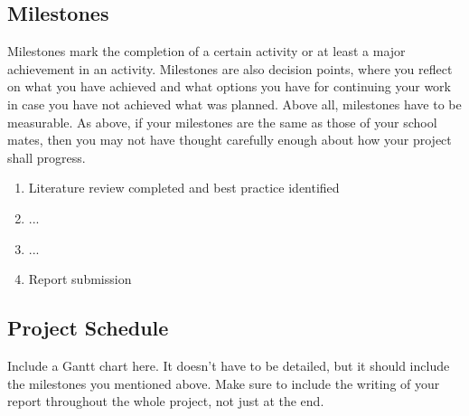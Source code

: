 \documentclass[rnd]{mas_proposal}
\begin{document}
\subsection{Milestones}
Milestones mark the completion of a certain activity or at least a major achievement in an activity. Milestones are also decision points, where you reflect on what you have achieved and what options you have for continuing your work in case you have not achieved what was planned. Above all, milestones have to be measurable. As above, if your milestones are the same as those of your school mates, then you may not have thought carefully enough about how your project shall progress.
\begin{enumerate}
    \item[M1] Literature review completed and best practice identified
    \item[M2] ...
    \item[M3] ...
    \item[M4] Report submission
\end{enumerate}

\subsection{Project Schedule}
Include a Gantt chart here. It doesn't have to be detailed, but it should include the milestones you mentioned above.
Make sure to include the writing of your report throughout the whole project, not just at the end.
\end{document}
